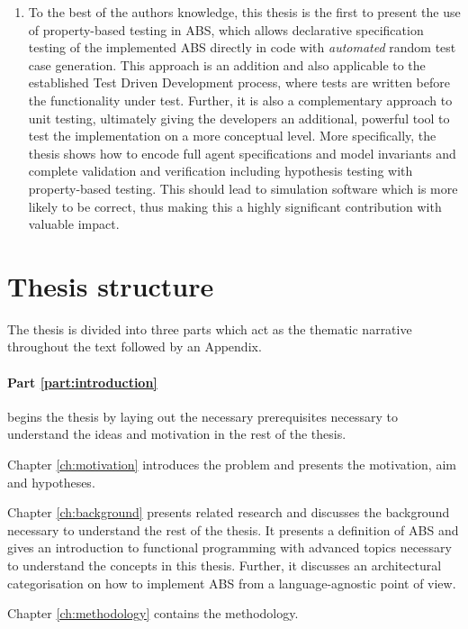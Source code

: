 \begin{enumerate}
	\item To the best of the authors knowledge, this thesis is the first to present the use of property-based testing in ABS, which allows declarative specification testing of the implemented ABS directly in code with \textit{automated} random test case generation. This approach is an addition and also applicable to the established Test Driven Development process, where tests are written before the functionality under test. Further, it is also a complementary approach to unit testing, ultimately giving the developers an additional, powerful tool to test the implementation on a more conceptual level. More specifically, the thesis shows how to encode full agent specifications and model invariants and complete validation and verification including hypothesis testing with property-based testing. This should lead to simulation software which is more likely to be correct, thus making this a highly significant contribution with valuable impact.
\end{enumerate}

\section{Thesis structure}
The thesis is divided into three parts which act as the thematic narrative throughout the text followed by an Appendix. 

\paragraph{Part \ref{part:introduction}} begins the thesis by laying out the necessary prerequisites necessary to understand the ideas and motivation in the rest of the thesis.
\medskip

Chapter \ref{ch:motivation} introduces the problem and presents the motivation, aim and hypotheses.

\medskip

Chapter \ref{ch:background} presents related research and discusses the background necessary to understand the rest of the thesis. It presents a definition of ABS and gives an introduction to functional programming with advanced topics necessary to understand the concepts in this thesis. Further, it discusses an architectural categorisation on how to implement ABS from a language-agnostic point of view.

\medskip

Chapter \ref{ch:methodology} contains the methodology.


